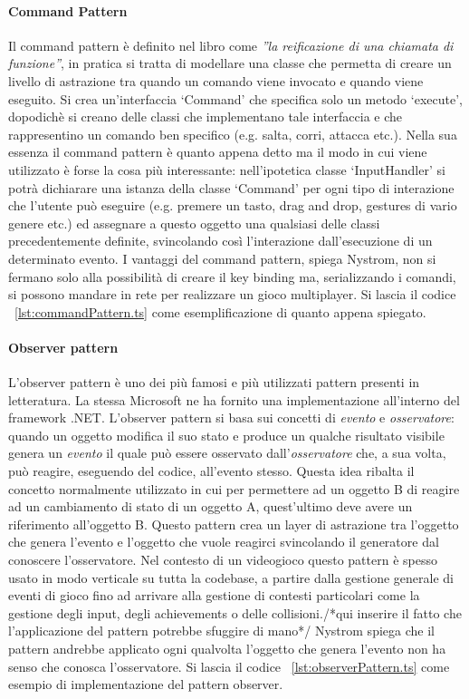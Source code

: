 \paragraph{Command Pattern}
Il command pattern è definito nel libro come \textit{''la reificazione 
di una chiamata di funzione''}, in pratica si tratta di modellare una classe
che permetta di creare un livello di astrazione tra quando un comando
viene invocato e quando viene eseguito. Si crea un'interfaccia `Command'
che specifica solo un metodo `execute', dopodichè si creano delle classi
che implementano tale interfaccia e che rappresentino un comando ben specifico
(e.g. salta, corri, attacca etc.). Nella sua essenza il command pattern è quanto
appena detto ma il modo in cui viene utilizzato è forse la cosa più interessante:
nell'ipotetica classe `InputHandler' si potrà dichiarare una istanza della classe
`Command' per ogni tipo di interazione che l'utente può eseguire (e.g. premere un tasto,
drag and drop, gestures di vario genere etc.) ed assegnare a questo oggetto una qualsiasi
delle classi precedentemente definite, svincolando così l'interazione dall'esecuzione
di un determinato evento. I vantaggi del command pattern, spiega Nystrom, non si
fermano solo alla possibilità di creare il key binding ma, serializzando i comandi,
si possono mandare in rete per realizzare un gioco multiplayer. Si lascia il codice
~\ref{lst:commandPattern.ts} come esemplificazione di quanto appena spiegato.

\paragraph{Observer pattern}
L'observer pattern è uno dei più famosi e più utilizzati pattern presenti in
letteratura. La stessa Microsoft ne ha fornito una implementazione all'interno del framework 
.NET. L'observer pattern si basa sui concetti di \textit{evento} e \textit{osservatore}:
quando un oggetto modifica il suo stato e produce un qualche risultato visibile
genera un \textit{evento} il quale può essere osservato dall'\textit{osservatore} 
che, a sua volta, può reagire, eseguendo del codice, all'evento stesso. Questa idea
ribalta il concetto normalmente utilizzato in cui per permettere ad un oggetto B
di reagire ad un cambiamento di stato di un oggetto A, quest'ultimo deve avere
un riferimento all'oggetto B. Questo pattern crea un layer di astrazione tra l'oggetto
che genera l'evento e l'oggetto che vuole reagirci svincolando il generatore dal
conoscere l'osservatore. Nel contesto di un videogioco questo pattern è spesso usato in modo
verticale su tutta la codebase, a partire dalla gestione generale di eventi di gioco fino ad arrivare
alla gestione di contesti particolari come la gestione degli input, degli achievements o delle
collisioni./*qui inserire il fatto che l'applicazione del pattern potrebbe sfuggire di mano*/ 
Nystrom spiega che il pattern andrebbe applicato ogni qualvolta l'oggetto che genera l'evento
non ha senso che conosca l'osservatore. Si lascia il codice ~\ref{lst:observerPattern.ts} come esempio
di implementazione del pattern observer.


